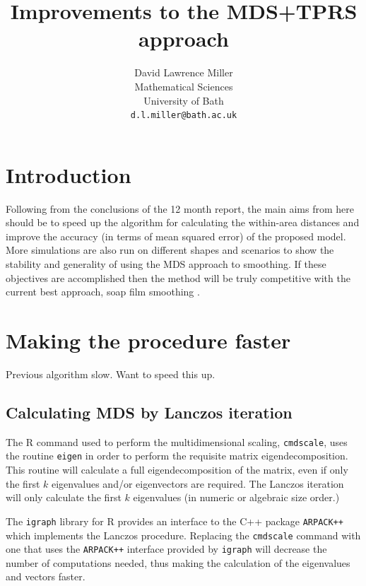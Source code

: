 \documentclass[a4paper,10pt]{article}
\title{Improvements to the MDS+TPRS approach}
\author{David Lawrence Miller\\Mathematical Sciences\\University of Bath\\\texttt{d.l.miller@bath.ac.uk}}
\begin{document}
 
 
 
\newtheorem{thm}{Theorem}[section]
 
\newtheorem{defn}{Definition}[section]
 
\maketitle

\section{Introduction}

Following from the conclusions of the 12 month report, the main aims from here should be to speed up the algorithm for calculating the within-area distances and improve the accuracy (in terms of mean squared error) of the proposed model. More simulations are also run on different shapes and scenarios to show the stability and generality of using the MDS approach to smoothing. If these objectives are accomplished then the method will be truly competitive with the current best approach, soap film smoothing \cite{soap}.


\section{Making the procedure faster}

Previous algorithm slow. Want to speed this up. 

\subsection{Calculating MDS by Lanczos iteration}

The \textsf{R} command used to perform the multidimensional scaling, \texttt{cmdscale}, uses the routine \texttt{eigen} in order to perform the requisite matrix eigendecomposition. This routine will calculate a full eigendecomposition of the matrix, even if only the first $k$ eigenvalues and/or eigenvectors are required. The Lanczos iteration will only calculate the first $k$ eigenvalues (in numeric or algebraic size order.)

The \texttt{igraph} library for \textsf{R} provides an interface to the C++ package \texttt{ARPACK++} which implements the Lanczos procedure. Replacing the \texttt{cmdscale} command with one that uses the \texttt{ARPACK++} interface provided by \texttt{igraph} will decrease the number of computations needed, thus making the calculation of the eigenvalues and vectors faster.
\end{document}
